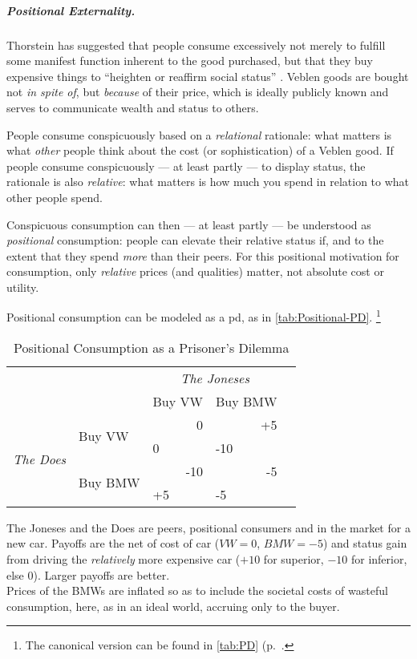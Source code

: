 \subparagraph{Positional Externality.}
	\label{sec:positional-race}
Thorstein \cite{Veblen1899} has suggested that people consume excessively not merely to fulfill some manifest function inherent to the good purchased, but that they buy expensive things to ``heighten or reaffirm social status'' \citep[123]{Merton-1968-aa}.
Veblen goods are bought not \emph{in spite of}, but \emph{because} of their price, which is ideally publicly known and serves to communicate wealth and status to others.

People consume conspicuously based on a \emph{relational} rationale:
what matters is what \emph{other} people think about the cost (or sophistication) of a Veblen good.
If people consume conspicuously --- at least partly --- to display status, the rationale is also \emph{relative}:
what matters is how much you spend in relation to what other people spend.

Conspicuous consumption can then --- at least partly --- be understood as \emph{positional} consumption:
people can elevate their relative status if, and to the extent that they spend \emph{more} than their peers.
For this positional motivation for consumption, only \emph{relative} prices (and qualities) matter, not absolute cost or utility.

Positional consumption can be modeled as a \gls{pd}, as in \autoref{tab:Positional-PD}.
\footnote{
	The canonical version can be found in \autoref{tab:PD} (p.~\pageref{tab:PD}.
}

\begin{table}
	\caption{Positional Consumption as a Prisoner's Dilemma}
	\label{tab:Positional-PD}
	\begin{center}
	\begin{tabular}{m{1cm}m{}m{}m{}m{}}
		& & \multicolumn{2}{c}{\emph{The Joneses}} \\
		& &Buy VW & Buy BMW\\
		\cline{3-4}
		\multicolumn{1}{c}{\multirow{4}{*}{\emph{The Does}}} & \multirow{2}{2,3cm}{Buy VW} & 		\multicolumn{1}{|r|}{0} & \multicolumn{1}{r|}{+5}\\
		\multicolumn{1}{c}{} & \multicolumn{1}{c}{}& \multicolumn{1}{|l|}{0} & \multicolumn{1}{l|}{-10}\\
		\cline{3-4}
		\multicolumn{1}{c}{} & \multirow{2}{2,3cm}{Buy BMW} & \multicolumn{1}{|r|}{-10} & \multicolumn{1}{r|}{-5}\\
		\multicolumn{1}{c}{} & \multicolumn{1}{c}{}& \multicolumn{1}{|l|}{+5} & \multicolumn{1}{l|}{-5}\\
		\cline{3-4}
	\end{tabular}
	\end{center}
	\scriptsize{The Joneses and the Does are peers, positional consumers and in the market for a new car.
Payoffs are the net of cost of car ($VW=0$, $BMW=-5$) and status gain from driving the \emph{relatively} more expensive car ($+10$ for superior, $-10$ for inferior, else $0$).
Larger payoffs are better.\\
	Prices of the BMWs are inflated so as to include the societal costs of wasteful consumption, here, as in an ideal world, accruing only to the buyer.}
\end{table}

